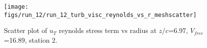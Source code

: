 \begin{figure}[H]
\centering
\texttt{[image: figs/run\_12/run\_12\_turb\_visc\_reynolds\_vs\_r\_meshscatter]}
\caption{Scatter plot of $
u_T$ reynolds stress term vs radius at $z/c$=6.97, $V_{free}$=16.89, station 2.}
\label{fig:run_12_turb_visc_reynolds_vs_r_meshscatter}
\end{figure}



